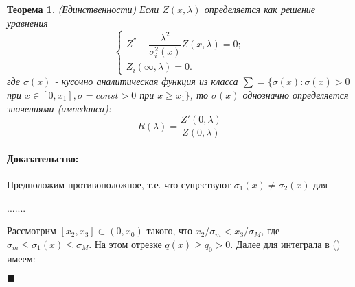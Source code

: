 \documentclass{article}
\newtheorem{theorem}{Теорема}
\newenvironment{proof}{\paragraph{Доказательство:}}{\hfill$\blacksquare$}
\begin{document}
\begin{theorem}
	(Единственности)
	Если $Z(x,\lambda)$ определяется как решение уравнения 
	\begin{equation*}
	\begin{cases}
		Z^{''} - \dfrac{\lambda^2}{\sigma_i^2(x)} Z(x,\lambda) = 0;\\
		Z_i(\infty,\lambda) = 0.
	\end{cases}
	\end{equation*}
	где $\sigma(x)$ - кусочно аналитическая функция из класса $\sum = \{ \sigma(x) : \sigma(x) > 0$ при $x \in [0,x_1], \sigma = const > 0$ при $x \geqslant x_1\}$, то $\sigma(x)$ однозначно определяется значениями (импеданса):
	\begin{equation*}
		R(\lambda) = \dfrac{Z'(0,\lambda)}{Z(0,\lambda)}
	\end{equation*}
\end{theorem}
\begin{proof}
	Предположим противоположное, т.е. что существуют $\sigma_1(x) \neq \sigma_2(x)$ для 
	
	.......
	
	Рассмотрим $[x_2,x_3] \subset (0, x_0)$ такого, что $x_2 / \sigma_m < x_3/\sigma_M$, где $\sigma_m \leqslant \sigma_1(x) \leqslant \sigma_M$.
	На этом отрезке $q(x) \geqslant q_0 > 0$.
	Далее для интеграла в () имеем:
	
\end{proof}
\end{document}
